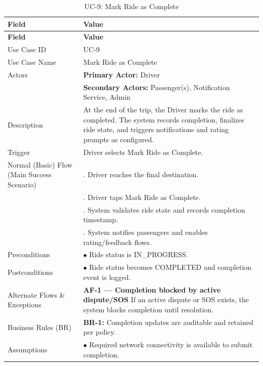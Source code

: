 \begin{longtable}{|>{\raggedright\arraybackslash}p{4cm}|>{\raggedright\arraybackslash}p{11cm}|}
\caption{UC-9: Mark Ride as Complete}
\label{tab:uc-9} \\
\hline
\rowcolor{lightgray!30}
\textbf{Field} & \textbf{Value} \\
\hline
\endfirsthead
\hline
\rowcolor{lightgray!30}
\textbf{Field} & \textbf{Value} \\
\hline
\endhead
\hline
\endfoot
\hline
\endlastfoot
Use Case ID & UC-9 \\
\hline
Use Case Name & Mark Ride as Complete \\
\hline
Actors & \textbf{Primary Actor:} Driver \\
& \textbf{Secondary Actors:} Passenger(s), Notification Service, Admin \\
\hline
Description & At the end of the trip, the Driver marks the ride as completed. The system records completion, finalizes ride state, and triggers notifications and rating prompts as configured. \\
\hline
Trigger & Driver selects Mark Ride as Complete. \\
\hline
Normal (Basic) Flow (Main Success Scenario) & 1. Driver reaches the final destination. \\
& 2. Driver taps Mark Ride as Complete. \\
& 3. System validates ride state and records completion timestamp. \\
& 4. System notifies passengers and enables rating/feedback flows. \\
\hline
Preconditions & $\bullet$ Ride status is IN\_PROGRESS. \\
\hline
Postconditions & $\bullet$ Ride status becomes COMPLETED and completion event is logged. \\
\hline
Alternate Flows \& Exceptions & \textbf{AF-1 — Completion blocked by active dispute/SOS} \newline If an active dispute or SOS exists, the system blocks completion until resolution. \\
\hline
Business Rules (BR) & \textbf{BR-1:} Completion updates are auditable and retained per policy. \\
\hline
Assumptions & $\bullet$ Required network connectivity is available to submit completion. \\
\end{longtable}

